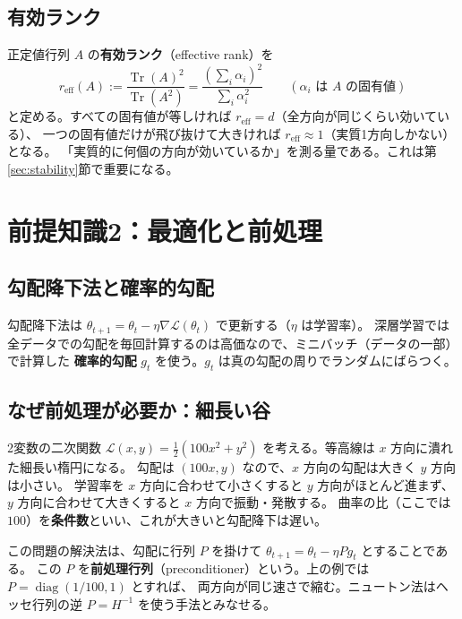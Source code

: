 \documentclass[a4paper,11pt]{ltjsarticle}
\theoremstyle{definition}
\theoremstyle{plain}
\DeclareMathOperator{\Tr}{Tr}
\DeclareMathOperator{\diag}{diag}
\newcommand{\reff}{r_{\mathrm{eff}}}
\begin{document}
\subsection{有効ランク}

正定値行列 $A$ の\textbf{有効ランク}（effective rank）を
\begin{equation}
  \reff(A) := \frac{\Tr(A)^2}{\Tr(A^2)} = \frac{(\sum_i \alpha_i)^2}{\sum_i \alpha_i^2}\qquad(\alpha_i\text{ は }A\text{ の固有値})
\end{equation}
と定める。すべての固有値が等しければ $\reff = d$（全方向が同じくらい効いている）、
一つの固有値だけが飛び抜けて大きければ $\reff\approx 1$（実質1方向しかない）となる。
「実質的に何個の方向が効いているか」を測る量である。これは第\ref{sec:stability}節で重要になる。

\section{前提知識2：最適化と前処理}\label{sec:prereq-opt}

\subsection{勾配降下法と確率的勾配}

勾配降下法は $\theta_{t+1} = \theta_t - \eta\nabla\mathcal{L}(\theta_t)$ で更新する（$\eta$ は学習率）。
深層学習では全データでの勾配を毎回計算するのは高価なので、ミニバッチ（データの一部）で計算した
\textbf{確率的勾配} $g_t$ を使う。$g_t$ は真の勾配の周りでランダムにばらつく。

\subsection{なぜ前処理が必要か：細長い谷}

2変数の二次関数 $\mathcal{L}(x,y) = \frac12(100x^2 + y^2)$ を考える。等高線は $x$ 方向に潰れた細長い楕円になる。
勾配は $(100x, y)$ なので、$x$ 方向の勾配は大きく $y$ 方向は小さい。
学習率を $x$ 方向に合わせて小さくすると $y$ 方向がほとんど進まず、
$y$ 方向に合わせて大きくすると $x$ 方向で振動・発散する。
曲率の比（ここでは $100$）を\textbf{条件数}といい、これが大きいと勾配降下は遅い。

この問題の解決法は、勾配に行列 $P$ を掛けて $\theta_{t+1} = \theta_t - \eta P g_t$ とすることである。
この $P$ を\textbf{前処理行列}（preconditioner）という。上の例では $P = \diag(1/100, 1)$ とすれば、
両方向が同じ速さで縮む。ニュートン法はヘッセ行列の逆 $P = H^{-1}$ を使う手法とみなせる。
\end{document}
